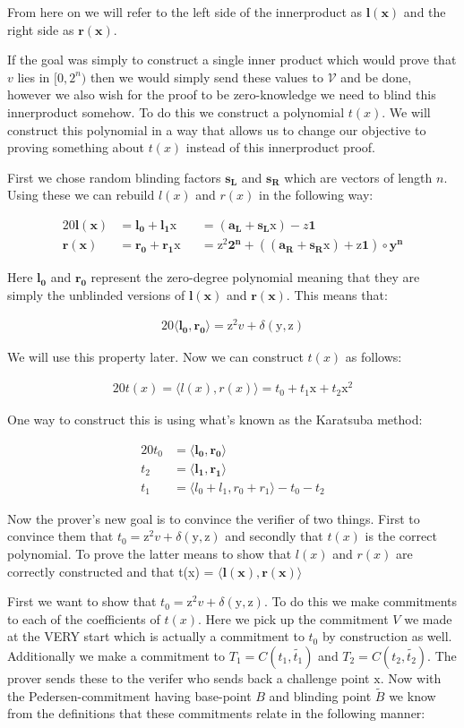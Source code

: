 \documentclass{article}
\newcommand{\eq}[1]{\begin{alignat*}{20}#1\end{alignat*}}
\renewcommand{\vec}[1]{\boldsymbol{#1}}
\newcommand{\ran}[1]{\mathrm{#1}}
\newcommand{\vecran}[1]{\mathbf{#1}}
\newcommand{\V}{\mathcal{V}}
\newcommand{\dotp}[2]{\langle #1, #2 \rangle}
\begin{document}
From here on we will refer to the left side of the innerproduct as $\vec{l(x)}$ and the right side as $\vec{r(x)}$.

If the goal was simply to construct a single inner product which would prove that $v$ lies in $[0,2^n)$ then we would simply send these values to $\V$ and be done, however we also wish for the proof to be zero-knowledge we need to blind this innerproduct somehow. To do this we construct a polynomial $t(x)$. We will construct this polynomial in a way that allows us to change our objective to proving something about $t(x)$ instead of this innerproduct proof.

First we chose random blinding factors $\vecran{s_L}$ and $\vecran{s_R}$ which are vectors of length $n$. Using these we can rebuild $l(x)$ and $r(x)$ in the following way:

\eq{
	\vec{l(x)} &= \vec{l_0} + \vec{l_1}\ran{x} &&= (\vec{a_L} + \vec{s_L}\ran{x}) - z\vec{1}\\
	\vec{r(x)} &= \vec{r_0} + \vec{r_1}\ran{x} &&= \ran{z^2}\vec{2^n} + ((\vec{a_R} + \vec{s_R}\ran{x}) + \ran{z}\vec{1})\circ\vecran{y^n}
}

Here $\vec{l_0}$ and $\vec{r_0}$ represent the zero-degree polynomial meaning that they are simply the unblinded versions of $\vec{l(x)}$ and $\vec{r(x)}$. This means that:

\eq{
	\dotp{\vec{l_0}}{\vec{r_0}} = \ran{z^2}v + \delta(\ran{y},\ran{z})
}

We will use this property later. Now we can construct $t(x)$ as follows:

\eq{
	t(x) = \dotp{l(x)}{r(x)} = t_0 + t_1\ran{x} + t_2\ran{x^2}
}

One way to construct this is using what's known as the Karatsuba method:

\eq{
	t_0 &= \dotp{\vec{l_0}}{\vec{r_0}}\\
	t_2 &= \dotp{\vec{l_1}}{\vec{r_1}}\\
	t_1 &= \dotp{l_0+l_1}{r_0 + r_1} - t_0 - t_2
}

Now the prover's new goal is to convince the verifier of two things. First to convince them that $t_0 = \ran{z^2}v + \delta(\ran{y},\ran{z})$ and secondly that $t(x)$ is the correct polynomial. To prove the latter means to show that $l(x)$ and $r(x)$ are correctly constructed and that t(x) = $\dotp{\vec{l(x)}}{\vec{r(x)}}$

First we want to show that $t_0 = \ran{z^2}v + \delta(\ran{y},\ran{z})$. To do this we make commitments to each of the coefficients of $t(x)$. Here we pick up the commitment $V$ we made at the VERY start which is actually a commitment to $t_0$ by construction as well. Additionally we make a commitment to $T_1 = C(t_1, \widetilde{t_1})$ and $T_2 = C(t_2, \widetilde{t_2})$. The prover sends these to the verifer who sends back a challenge point $\ran{x}$. Now with the Pedersen-commitment having base-point $B$ and blinding point $\widetilde{B}$ we know from the definitions that these commitments relate in the following manner:
\end{document}

